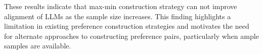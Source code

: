These results indicate that max-min construction strategy can not improve alignment of LLMs as the sample size increases.  
This finding highlights a limitation in existing preference construction strategies and motivates the need for alternate approaches to constructing preference pairs, particularly when ample samples are available.  



